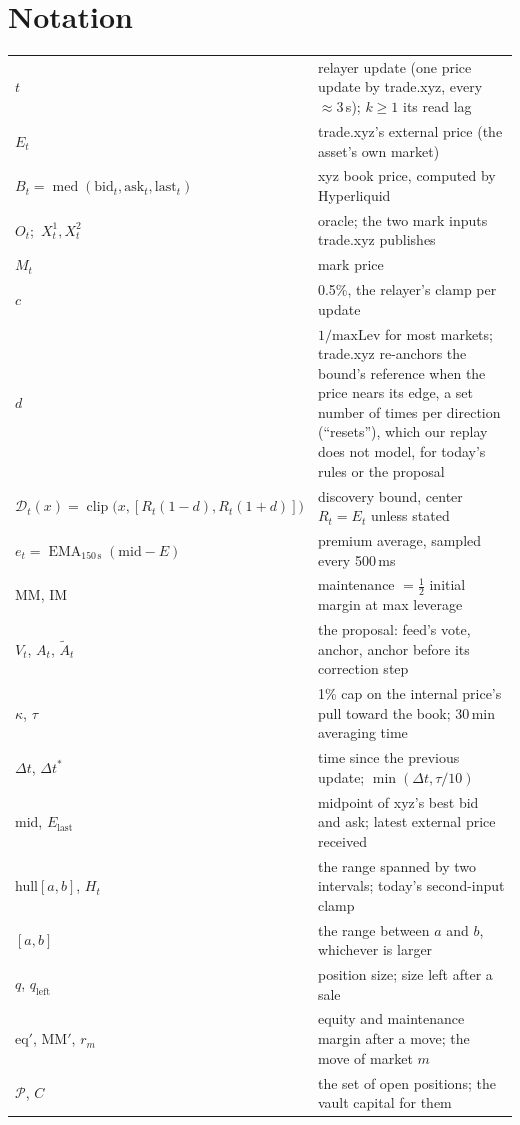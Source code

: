 \documentclass[10.5pt,a4paper]{article}
\newcommand{\med}{\operatorname{med}}
\newcommand{\clip}{\operatorname{clip}}
\newcommand{\ema}{\operatorname{EMA}}
\newcommand{\D}{\mathcal{D}}
\begin{document}
\section*{Notation}
\begin{xltabular}{\textwidth}{@{}>{\raggedright\arraybackslash}p{5.6cm}X@{}}
$t$ & relayer update (one price update by trade.xyz, every $\approx 3$\,s); $k\ge1$ its read lag\\
$E_t$ & trade.xyz's external price (the asset's own market)\\
$B_t = \med(\text{bid}_t,\text{ask}_t,\text{last}_t)$ & xyz book price, computed by Hyperliquid\\
$O_t$;\ $X^1_t, X^2_t$ & oracle; the two mark inputs trade.xyz publishes\\
$M_t$ & mark price\\
$c$ & 0.5\%, the relayer's clamp per update\\
$d$ & $1/\text{maxLev}$ for most markets; trade.xyz re-anchors the bound's reference when the price nears its edge, a set number of times per direction (``resets''), which our replay does not model, for today's rules or the proposal\\
$\D_t(x) = \clip\big(x,[R_t(1-d),R_t(1+d)]\big)$ & discovery bound, center $R_t = E_t$ unless stated\\
$e_t = \ema_{150\,\text{s}}(\text{mid}-E)$ & premium average, sampled every 500\,ms\\
MM, IM & maintenance $=\tfrac12$ initial margin at max leverage\\
$V_t$, $A_t$, $\tilde A_t$ & the proposal: feed's vote, anchor, anchor before its correction step\\
$\kappa$, $\tau$ & 1\% cap on the internal price's pull toward the book; 30\,min averaging time\\
$\Delta t$, $\Delta t^*$ & time since the previous update; $\min(\Delta t, \tau/10)$\\
mid, $E_{\text{last}}$ & midpoint of xyz's best bid and ask; latest external price received\\
hull$[a,b]$, $H_t$ & the range spanned by two intervals; today's second-input clamp\\
$[a,b]$ & the range between $a$ and $b$, whichever is larger\\
$q$, $q_{\text{left}}$ & position size; size left after a sale\\
eq$'$, MM$'$, $r_m$ & equity and maintenance margin after a move; the move of market $m$\\
$\mathcal{P}$, $C$ & the set of open positions; the vault capital for them
\end{xltabular}
\end{document}
